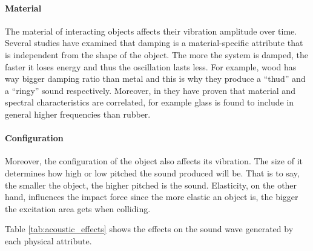 \paragraph{Material\\}
The material of interacting objects affects their vibration amplitude over time. Several studies \cite{wildes1988recovering, giordano2006material} have examined that damping is a material-specific attribute that is independent from the shape of the object. The more the system is damped, the faster it loses energy and thus the oscillation lasts less. For example, wood has way bigger damping ratio than metal and this is why they produce a ``thud'' and a ``ringy'' sound respectively. Moreover, in \cite{klatzky2000perception} they have proven that material and spectral characteristics are correlated, for example glass is found to include in general higher frequencies than rubber. 

\paragraph{Configuration\\}
Moreover, the configuration of the object also affects its vibration. The size of it determines how high or low pitched the sound produced will be. That is to say, the smaller the object, the higher pitched is the sound. Elasticity, on the other hand, influences the impact force since the more elastic an object is, the bigger the excitation area gets when colliding.  

Table \ref{tab:acoustic_effects} shows the effects on the sound wave generated by each physical attribute. 


